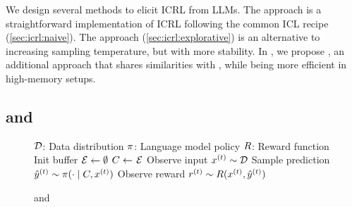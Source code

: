 We design several methods to elicit ICRL from LLMs. 
The \naiveshort approach is a straightforward implementation of ICRL following the common ICL recipe (\autoref{sec:icrl:naive}). The \expshort approach (\autoref{sec:icrl:explorative}) is an alternative to increasing sampling temperature, but with more stability. In , we propose \approximate, an additional approach that shares similarities with  \expshort, while being more efficient in high-memory setups.  



\subsection{\naiveshort and \naiveplus}\label{sec:icrl:naive}

\begin{figure}[t]
    \centering
    \begin{minipage}[t]{0.475\textwidth}
    \centering
    \begin{algorithm}[H]
        \footnotesize
        \caption{\naiveshort and \naiveplus}\label{alg:naive_icrl}
        \begin{algorithmic}[1]
            \REQUIRE
            \STATEX $\mathcal{D}$: Data distribution
            \STATEX $\pi$: Language model policy
            \STATEX $R$: Reward function
            \STATEX
            \STATE Init buffer $\mathcal{E} \gets \emptyset$
                \STATE $C \gets$ $\mathcal{E}$ \label{ln:naive:context-construct}
                \STATE Observe input $x^{(t)} \sim \mathcal{D}$
                \STATE Sample prediction $\hat{y}^{(t)} \sim \pi(\cdot \mid C, x^{(t)})$ \label{ln:naive:predict}
                \STATE Observe reward $r^{(t)} \sim R(x^{(t)}, \hat{y}^{(t)})$
                 \label{ln:naiveplus:check_reward}
                  

\end{algorithmic}
\end{algorithm}
\end{minipage}
\end{figure}
